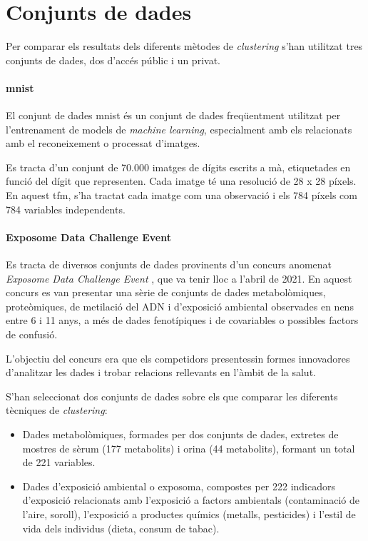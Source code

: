 \documentclass[CAT,BIB]{TFUOC}%
\begin{document}
    \section{Conjunts de dades}
    \label{s:dades}

    Per comparar els resultats dels diferents mètodes de \textit{clustering}
    s'han utilitzat tres conjunts de dades,
    dos d'accés públic i un privat.

    \paragraph{\acrshort{mnist}}
        El conjunt de dades \gls{mnist} \citep{Deng2012}
        és un conjunt de dades freqüentment utilitzat
        per l'entrenament de models de \textit{machine learning},
        especialment amb els relacionats amb el reconeixement o processat d'imatges.

        Es tracta d'un conjunt de 70.000 imatges
        de dígits escrits a mà,
        etiquetades en funció del dígit que representen.
        Cada imatge té una resolució de 28 x 28 píxels.
        En aquest \gls{tfm}, s'ha tractat cada imatge com una observació
        i els 784 píxels com 784 variables independents.

    \paragraph{Exposome Data Challenge Event}
        Es tracta de diversos conjunts de dades
        provinents d'un concurs anomenat \textit{Exposome Data Challenge Event} \citep{Maitre2022},
        que va tenir lloc a l'abril de 2021.
        En aquest concurs es van presentar una sèrie de conjunts de dades
        metabolòmiques, proteòmiques, de metilació del ADN i d'exposició ambiental
        observades en nens entre 6 i 11 anys,
        a més de dades fenotípiques
        i de covariables o possibles factors de confusió.

        L'objectiu del concurs era que els competidors
        presentessin formes innovadores d'analitzar les dades
        i trobar relacions rellevants en l'àmbit de la salut.

        S'han seleccionat dos conjunts de dades
        sobre els que comparar les diferents tècniques de \textit{clustering}:

        \begin{itemize}
            \item Dades metabolòmiques, formades per dos conjunts de dades,
            extretes de mostres de sèrum (177 metabolits) i orina (44 metabolits),
            formant un total de 221 variables.

            \item Dades d'exposició ambiental o exposoma,
            compostes per 222 indicadors d'exposició
            relacionats amb l'exposició a factors ambientals
            (contaminació de l'aire, soroll),
            l'exposició a productes químics
            (metalls, pesticides)
            i l'estil de vida dels individus
            (dieta, consum de tabac).
        \end{itemize}
\end{document}
